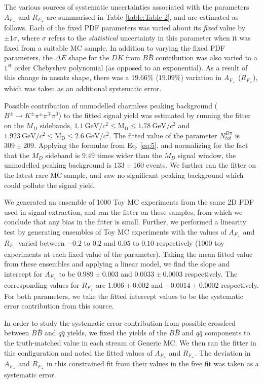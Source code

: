 \documentclass[aps,prl,twocolumn,superscriptaddress,showpacs,preprintnumbers,amsmath,amssymb]{revtex4}
\begin{document}
The various sources of systematic uncertainties associated with the parameters $A_{F_{+}}$ and $R_{F_{+}}$ are summarised in Table \ref{table:Table 2}, and are estimated as follows. Each of the fixed PDF parameters was varied about its \textit{fixed} value by $\pm 1\sigma$, where $\sigma$ refers to the \textit{statistical} uncertainty in this parameter when it was fixed from a suitable MC sample. In addition to varying the fixed PDF parameters, the $\Delta E$ shape for the $DK$ from $B\bar{B}$ contribution was also varied to a $1^{st}$ order Chebyshev polynomial (as opposed to an exponential). As a result of this change in ansatz shape, there was a $19.66  \%$ ($19.09 \%$) variation in $A_{F_+}$ ($R_{F_{+}}$), which was taken as an additional systematic error.

Possible contribution of unmodelled charmless peaking background ($B^{\pm} \rightarrow K^{\pm}\pi^{\pm}\pi^{\mp}\pi^0$) to the fitted signal yield was estimated by running the fitter on the $M_{D}$ sidebands, $1.1 ~ \mathrm{GeV/}c^2 \leq {\mathrm{M_{D}}} \leq 1.78 ~ \mathrm{GeV/}c^2$ and  $1.923 ~ \mathrm{GeV/}c^2 \leq {\mathrm{M_{D}}} \leq 2.6 ~ \mathrm{GeV/}c^2$. The fitted value of the parameter $N^{D\pi}_{tot}$ is $309 \pm 209$. Applying the formulae from Eq. \ref{eq:5}, and normalizing for the fact that the $M_{D}$ sideband is $9.49$ times wider than the $M_{D}$ signal window, the unmodelled peaking background is $133 \pm 160$ events. We further ran the fitter on the latest rare MC sample, and saw no significant peaking background which could pollute the signal yield. 

We generated an ensemble of 1000 Toy MC experiments from the same 2D PDF used in signal extraction, and ran the fitter on these samples, from which we conclude that any bias in the fitter is small. Further, we performed a linearity test by generating ensembles of Toy MC experiments with the values of $A_{F_+}$ and $R_{F_{+}}$ varied between $-0.2$ to $0.2$ and $0.05$ to $0.10$ respectively (1000 toy experiments at each fixed value of the parameter). Taking the mean fitted value from these ensembles and applying a linear model, we find the slope and intercept for $A_{F_{+}}$ to be $0.989 \pm 0.003$ and $0.0033 \pm 0.0003$ respectively. The corresponding values for $R_{F_{+}}$ are $1.006 \pm 0.002$ and $-0.0014 \pm 0.0002$ respectively. For both parameters, we take the fitted intercept values to be the systematic error contribution from this source. 

In order to study the systematic error contribution from possible crossfeed between $B\bar{B}$ and $q\bar{q}$ yields, we fixed the yields of the $B\bar{B}$ and $q\bar{q}$ components to the truth-matched value in each stream of Generic MC. We then ran the fitter in this configuration and noted the fitted values of $A_{F_{+}}$ and $R_{F_{+}}$. The deviation in $A_{F_{+}}$ and $R_{F_{+}}$ in this constrained fit from their values in the free fit was taken as a systematic error.
\end{document}

